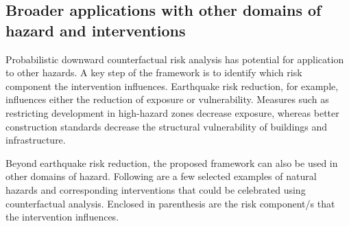 \subsection{Broader applications with other domains of hazard and interventions}
\label{subsec-broadapps}

Probabilistic downward counterfactual risk analysis has potential for application to other hazards. A key step of the framework is to identify which risk component the intervention influences. Earthquake risk reduction, for example, influences either the reduction of exposure or vulnerability. Measures such as restricting development in high-hazard zones decrease exposure, whereas better construction standards decrease the structural vulnerability of buildings and infrastructure.

Beyond earthquake risk reduction, the proposed framework can also be used in other domains of hazard. Following are a few selected examples of natural hazards and corresponding interventions that could be celebrated using counterfactual analysis. Enclosed in parenthesis are the risk component/s that the intervention influences.

